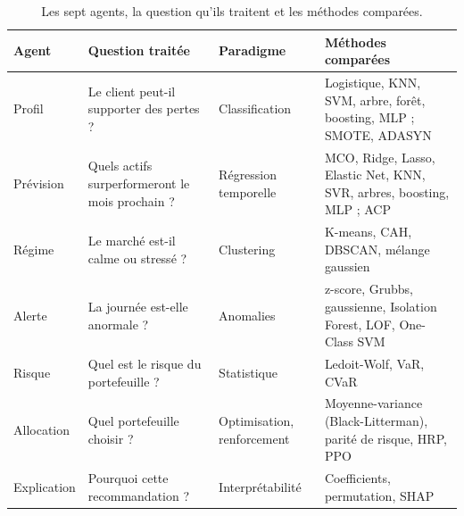 \begin{table}[H]
  \centering
  \small
  \caption{Les sept agents, la question qu'ils traitent et les méthodes comparées.}
  \label{tab:agents}
  \begin{tabularx}{\textwidth}{@{}l L l L@{}}
    \toprule
    \textbf{Agent} & \textbf{Question traitée} & \textbf{Paradigme} & \textbf{Méthodes comparées} \\
    \midrule
    Profil      & Le client peut-il supporter des pertes ? & Classification & Logistique, KNN, SVM, arbre, forêt, boosting, MLP ; SMOTE, ADASYN \\
    Prévision   & Quels actifs surperformeront le mois prochain ? & Régression temporelle & MCO, Ridge, Lasso, Elastic Net, KNN, SVR, arbres, boosting, MLP ; ACP \\
    Régime      & Le marché est-il calme ou stressé ? & Clustering & K-means, CAH, DBSCAN, mélange gaussien \\
    Alerte      & La journée est-elle anormale ? & Anomalies & z-score, Grubbs, gaussienne, Isolation Forest, LOF, One-Class SVM \\
    Risque      & Quel est le risque du portefeuille ? & Statistique & Ledoit-Wolf, VaR, CVaR \\
    Allocation  & Quel portefeuille choisir ? & Optimisation, renforcement & Moyenne-variance (Black-Litterman), parité de risque, HRP, PPO \\
    Explication & Pourquoi cette recommandation ? & Interprétabilité & Coefficients, permutation, SHAP \\
    \bottomrule
  \end{tabularx}
\end{table}

